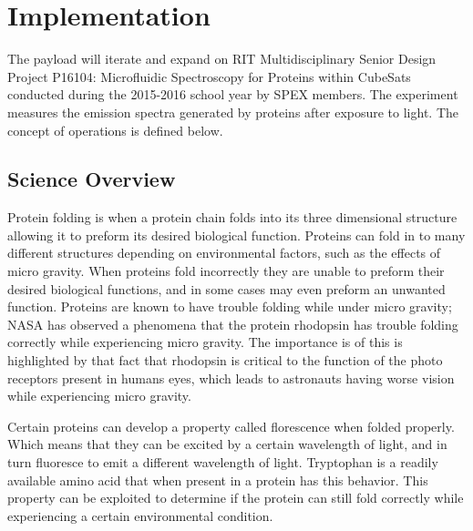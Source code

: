 \documentclass[conference]{IEEEtran} %
\begin{document}
\section{Implementation}
\label{sec:implementation}
  
The payload will iterate and expand on RIT Multidisciplinary Senior Design Project P16104: Microfluidic Spectroscopy for Proteins within CubeSats ~\cite{msd} conducted during the 2015-2016 school year by SPEX members. The experiment measures the emission spectra generated by proteins after exposure to light. The concept of operations is defined below. 

\subsection{Science Overview}
\label{subsec:sci-overview}

Protein folding is when a protein chain folds into its three dimensional structure allowing it to preform its desired biological function. Proteins can fold in to many different structures depending on environmental factors, such as the effects of micro gravity. When proteins fold incorrectly they are unable to preform their desired biological functions, and in some cases may even preform an unwanted function. Proteins are known to have trouble folding while under micro gravity; NASA has observed a phenomena that the protein rhodopsin has trouble folding correctly while experiencing micro gravity. The importance is of this is highlighted by that fact that rhodopsin is critical to the function of the photo receptors present in humans eyes, which leads to astronauts having worse vision while experiencing micro gravity.

Certain proteins can develop a property called florescence when folded properly. Which means that they can be excited by a certain wavelength of light, and in turn fluoresce to emit a different wavelength of light. Tryptophan is a readily available amino acid that when present in a protein has this behavior. This property can be exploited to determine if the protein can still fold correctly while experiencing a certain environmental condition.
\end{document}
